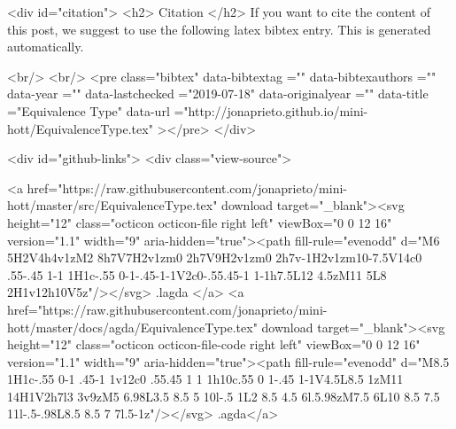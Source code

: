   
  <div id="citation">
  <h2> Citation </h2>
  If you want to cite the content of this post,
  we suggest to use the following latex bibtex entry.
  This is generated automatically.

  <br/>
  <br/>
  <pre class="bibtex"
       data-bibtextag =""
       data-bibtexauthors =""
       data-year =""
       data-lastchecked ="2019-07-18"
       data-originalyear =""
       data-title ="Equivalence Type"
       data-url ="http://jonaprieto.github.io/mini-hott/EquivalenceType.tex"
  ></pre>
  </div>
  

  <div id="github-links">
    <div class="view-source">
      
        <a href="https://raw.githubusercontent.com/jonaprieto/mini-hott/master/src/EquivalenceType.tex" download target="_blank"><svg height="12" class="octicon octicon-file right left" viewBox="0 0 12 16" version="1.1" width="9" aria-hidden="true"><path fill-rule="evenodd" d="M6 5H2V4h4v1zM2 8h7V7H2v1zm0 2h7V9H2v1zm0 2h7v-1H2v1zm10-7.5V14c0 .55-.45 1-1 1H1c-.55 0-1-.45-1-1V2c0-.55.45-1 1-1h7.5L12 4.5zM11 5L8 2H1v12h10V5z"/></svg> .lagda </a>
        <a href="https://raw.githubusercontent.com/jonaprieto/mini-hott/master/docs/agda/EquivalenceType.tex" download target="_blank"><svg height="12" class="octicon octicon-file-code right left" viewBox="0 0 12 16" version="1.1" width="9" aria-hidden="true"><path fill-rule="evenodd" d="M8.5 1H1c-.55 0-1 .45-1 1v12c0 .55.45 1 1 1h10c.55 0 1-.45 1-1V4.5L8.5 1zM11 14H1V2h7l3 3v9zM5 6.98L3.5 8.5 5 10l-.5 1L2 8.5 4.5 6l.5.98zM7.5 6L10 8.5 7.5 11l-.5-.98L8.5 8.5 7 7l.5-1z"/></svg> .agda</a>
      

